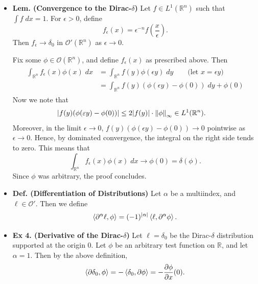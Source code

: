 \documentclass{article}
\begin{document}
\begin{itemize}
	\item \textbf{Lem. (Convergence to the Dirac-$\delta$)} Let $f \in L^{1}(\mathbb{R}^{n})$ such that $\int f\;dx = 1$. For $\epsilon > 0$, define 
		\begin{equation}
			f_{\epsilon}(x) = \epsilon^{-n}f\left(\frac{x}{\epsilon}\right). 
		\end{equation}
	Then $f_{\epsilon} \to \delta_{0}$ in $\mathcal{O}'(\mathbb{R}^{n})$ as $\epsilon \to 0$. 
	
	{\color{blue}
		Fix some $\phi \in \mathcal{O}(\mathbb{R}^{n})$, and define $f_{\epsilon}(x)$ as prescribed above. Then 
			\begin{align}
				\begin{split}
					\int_{\mathbb{R}^{n}}f_{\epsilon}(x) \phi(x)\;dx &= \int_{\mathbb{R}^{n}}f(y)\phi(\epsilon y)\;dy \qquad \text{(let $x = \epsilon y$)}\\
					&= \int_{\mathbb{R}^{n}}f(y)(\phi(\epsilon y) - \phi(0))\;dy + \phi(0)
				\end{split}
			\end{align}
		Now we note that  
			\begin{align}
				\begin{split}
					|f(y)(\phi(\varepsilon y) - \phi(0))| &\leq 2|f(y)|\cdot \left\Vert \phi \right\Vert_{\infty} \in L^{1}(\mathbb{R}^{n}). 
				\end{split}
			\end{align}
		Moreover, in the limit $\epsilon \to 0$, $f(y)(\phi(\epsilon y) - \phi(0)) \to 0$ pointwise as $\epsilon \to 0$. Hence, by dominated convergence, the integral on the right side tends to zero. This means that 
			\begin{equation}
				\int_{\mathbb{R}^{n}}f_{\epsilon}(x)\phi(x)\;dx \to \phi(0) = \delta(\phi). 
			\end{equation}
		Since $\phi$ was arbitrary, the proof concludes. 
	} 
	
	\item \textbf{Def. (Differentiation of Distributions)} Let $\alpha$ be a multiindex, and $\ell \in \mathcal{O}'$. Then we define 
		\begin{equation}
			\braket{\partial^{\alpha}\ell, \phi} = (-1)^{|\alpha|}\braket{\ell, \partial^{\alpha}\phi}. 
		\end{equation}
		
	\item \textbf{Ex 4. (Derivative of the Dirac-$\delta$)} Let $\ell = \delta_{0}$ be the Dirac-$\delta$ distribution supported at the origin $0$. Let $\phi$ be an arbitrary test function on $\mathbb{R}$, and let $\alpha= 1$. Then by the above definition, 
		\begin{equation}
			\braket{\partial \delta_{0}, \phi} = -\braket{\delta_{0}, \partial \phi} = -\frac{\partial \phi}{\partial x}(0). 
		\end{equation}
	

\end{itemize}
\end{document}
